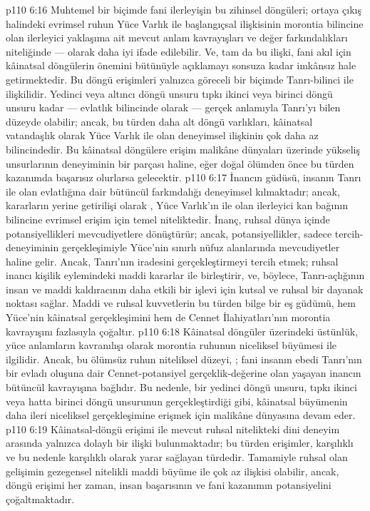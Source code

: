 \vs p110 6:16 Muhtemel bir biçimde fani ilerleyişin bu zihinsel döngüleri; ortaya çıkış halindeki evrimsel ruhun Yüce Varlık ile başlangıçsal ilişkisinin morontia bilincine olan ilerleyici yaklaşıma ait mevcut anlam kavrayışları ve değer farkındalıkları niteliğinde ---  olarak daha iyi ifade edilebilir. Ve, tam da bu ilişki, fani akıl için kâinatsal döngülerin önemini bütünüyle açıklamayı sonsuza kadar imkânsız hale getirmektedir. Bu döngü erişimleri yalnızca göreceli bir biçimde Tanrı\hyp{}bilinci ile ilişkilidir. Yedinci veya altıncı döngü unsuru tıpkı ikinci veya birinci döngü unsuru kadar --- evlatlık bilincinde olarak --- gerçek anlamıyla Tanrı’yı bilen düzeyde olabilir; ancak, bu türden daha alt döngü varlıkları, kâinatsal vatandaşlık olarak Yüce Varlık ile olan deneyimsel ilişkinin çok daha az bilincindedir. Bu kâinatsal döngülere erişim malikâne dünyaları üzerinde yükseliş unsurlarının deneyiminin bir parçası haline, eğer doğal ölümden önce bu türden kazanımda başarısız olurlarsa gelecektir.
\vs p110 6:17 İnancın güdüsü, insanın Tanrı ile olan evlatlığına dair bütüncül farkındalığı deneyimsel kılmaktadır; ancak, kararların yerine getirilişi olarak , Yüce Varlık’ın  ile olan ilerleyici kan bağının bilincine evrimsel erişim için temel niteliktedir. İnanç, ruhsal dünya içinde potansiyellikleri mevcudiyetlere dönüştürür; ancak, potansiyellikler, sadece tercih\hyp{}deneyiminin gerçekleşimiyle Yüce’nin sınırlı nüfuz alanlarında mevcudiyetler haline gelir. Ancak, Tanrı’nın iradesini gerçekleştirmeyi tercih etmek; ruhsal inancı kişilik eylemindeki maddi kararlar ile birleştirir, ve, böylece, Tanrı\hyp{}açlığının insan ve maddi kaldıracının daha etkili bir işlevi için kutsal ve ruhsal bir dayanak noktası sağlar. Maddi ve ruhsal kuvvetlerin bu türden bilge bir eş güdümü, hem Yüce’nin kâinatsal gerçekleşimini hem de Cennet İlahiyatları’nın morontia kavrayışını fazlasıyla çoğaltır.
\vs p110 6:18 Kâinatsal döngüler üzerindeki üstünlük, yüce anlamların kavranılışı olarak morontia ruhunun niceliksel büyümesi ile ilgilidir. Ancak, bu ölümsüz ruhun niteliksel düzeyi, ; fani insanın ebedi Tanrı’nın bir evladı oluşuna dair Cennet\hyp{}potansiyel gerçeklik\hyp{}değerine olan yaşayan inancın bütüncül kavrayışına bağlıdır. Bu nedenle, bir yedinci döngü unsuru, tıpkı ikinci veya hatta birinci döngü unsurunun gerçekleştirdiği gibi, kâinatsal büyümenin daha ileri niceliksel gerçekleşimine erişmek için malikâne dünyasına devam eder.
\vs p110 6:19 Kâinatsal\hyp{}döngü erişimi ile mevcut ruhsal nitelikteki dini deneyim arasında yalnızca dolaylı bir ilişki bulunmaktadır; bu türden erişimler, karşılıklı ve bu nedenle karşılıklı olarak yarar sağlayan türdedir. Tamamiyle ruhsal olan gelişimin gezegensel nitelikli maddi büyüme ile çok az ilişkisi olabilir, ancak, döngü erişimi her zaman, insan başarısının ve fani kazanımın potansiyelini çoğaltmaktadır.
